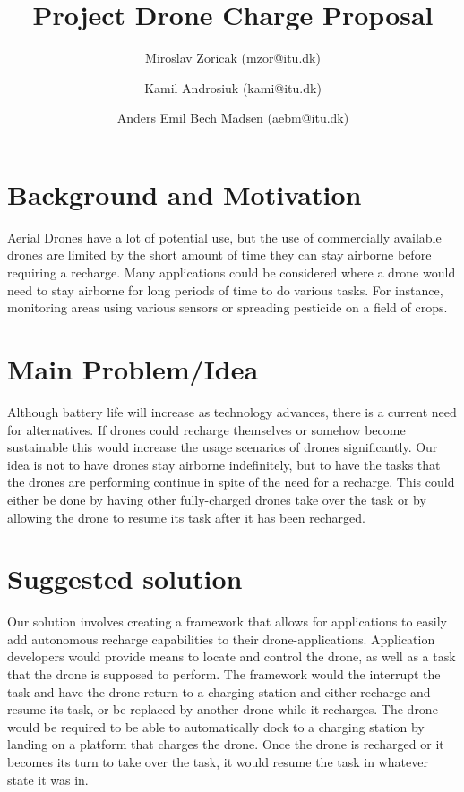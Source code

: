 \documentclass[11pt]{article} %
\title{Project Drone Charge Proposal}
\author{Miroslav Zoricak (mzor@itu.dk) \and Kamil Androsiuk (kami@itu.dk) \and Anders Emil Bech Madsen (aebm@itu.dk)}
\begin{document}
\maketitle

\section{Background and Motivation}
Aerial Drones have a lot of potential use, but the use of commercially available drones are limited by the short amount of time they can stay airborne before requiring a recharge. Many applications could be considered where a drone would need to stay airborne for long periods of time to do various tasks. For instance, monitoring areas using various sensors or spreading pesticide on a field of crops.

\section{Main Problem/Idea}
Although battery life will increase as technology advances, there is a current need for alternatives. If drones could recharge themselves or somehow become sustainable this would increase the usage scenarios of drones significantly. Our idea is not to have drones stay airborne indefinitely, but to have the tasks that the drones are performing continue in spite of the need for a recharge. This could either be done by having other fully-charged drones take over the task or by allowing the drone to resume its task after it has been recharged.

\section{Suggested solution}
Our solution involves creating a framework that allows for applications to easily add autonomous recharge capabilities to their drone-applications. Application developers would provide means to locate and control the drone, as well as a task that the drone is supposed to perform. The framework would the interrupt the task and have the drone return to a charging station and either recharge and resume its task, or be replaced by another drone while it recharges. The drone would be required to be able to automatically dock to a charging station by landing on a platform that charges the drone. Once the drone is recharged or it becomes its turn to take over the task, it would resume the task in whatever state it was in.
\end{document}
